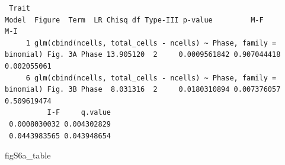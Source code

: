 \documentclass[
  landscape]{article}
\newenvironment{Shaded}{\begin{snugshade}}{\end{snugshade}}
\newcommand{\AttributeTok}[1]{\textcolor[rgb]{0.13,0.29,0.53}{#1}}
\newcommand{\FunctionTok}[1]{\textcolor[rgb]{0.13,0.29,0.53}{\textbf{#1}}}
\newcommand{\NormalTok}[1]{#1}
\newcommand{\OtherTok}[1]{\textcolor[rgb]{0.56,0.35,0.01}{#1}}
\newcommand{\SpecialCharTok}[1]{\textcolor[rgb]{0.81,0.36,0.00}{\textbf{#1}}}
\newcommand{\StringTok}[1]{\textcolor[rgb]{0.31,0.60,0.02}{#1}}
\begin{document}
\begin{Shaded}
\end{Shaded}

\begin{verbatim}
 Trait                                                               Model  Figure  Term  LR Chisq df Type-III p-value         M-F         M-I
     1 glm(cbind(ncells, total_cells - ncells) ~ Phase, family = binomial) Fig. 3A Phase 13.905120  2     0.0009561842 0.907044418 0.002055061
     6 glm(cbind(ncells, total_cells - ncells) ~ Phase, family = binomial) Fig. 3B Phase  8.031316  2     0.0180310894 0.007376057 0.509619474
          I-F     q.value
 0.0008030032 0.004302829
 0.0443983565 0.043948654
\end{verbatim}

\begin{Shaded}
\begin{Highlighting}[]
\NormalTok{figS6a\_table}
\end{Highlighting}
\end{Shaded}
\end{document}
